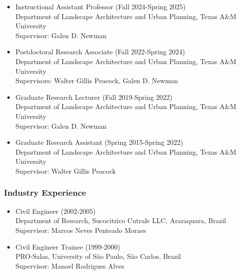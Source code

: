 \documentclass[11pt,oneside]{article}
\begin{document}
\begin{itemize}[leftmargin=40pt, label={-}]
\item {\frutigerregular Instructional Assistant Professor} (Fall 2024-Spring 2025)\\
	  {Department of Landscape Architecture and Urban Planning, Texas A\&M University}\\
      Supervisor: Galen D. Newman
\item {\frutigerregular Postdoctoral Research Associate} (Fall 2022-Spring 2024)\\
	  {Department of Landscape Architecture and Urban Planning, Texas A\&M University}\\
      Supervisors: Walter Gillis Peacock, Galen D. Newman
\item {\frutigerregular Graduate Research Lecturer} (Fall 2019-Spring 2022)\\
	  {Department of Landscape Architecture and Urban Planning, Texas A\&M University}\\
      Supervisor: Galen D. Newman
\item {\frutigerregular Graduate Research Assistant} (Spring 2015-Spring 2022)\\
	  {Department of Landscape Architecture and Urban Planning, Texas A\&M University}\\
      Supervisor: Walter Gillis Peacock
\end{itemize}

\newpage
\pagestyle{main}

\subsubsection{Industry Experience}
\begin{itemize}[leftmargin=40pt, label={-}]
\item {\frutigerregular Civil Engineer} (2002-2005)\\
      Department of Research, Sucocitrico Cutrale LLC, Araraquara, Brazil\\
      Supervisor: Marcos Neves Penteado Moraes\\
\item {\frutigerregular Civil Engineer Trainee} (1999-2000)\\
      PRO-Salas, University of São Paulo, São Carlos, Brazil\\
      Supervisor: Manoel Rodrigues Alves\\
\end{itemize}
\end{document}
